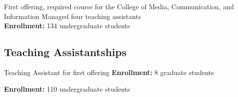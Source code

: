 \documentclass[10pt,letterpaper,final]{moderncv}
\begin{document}
{First offering, required course for the College of Media, Communication, and Information \newline Managed four teaching assistants \\{\textcolor{color5}{\textbf{Enrollment:}}} 134 undergraduate students }\vspace{6pt}
	
\subsection{Teaching Assistantships}
{\small 
	Teaching Assistant for first offering\newline\vspace{6pt}
	{\textcolor{color5}{\textbf{Enrollment:}}} 8 graduate students}
	
{\small
	{\textcolor{color5}{\textbf{Enrollment:}}} 110 undergraduate students }\vspace{3pt}

\end{document}
